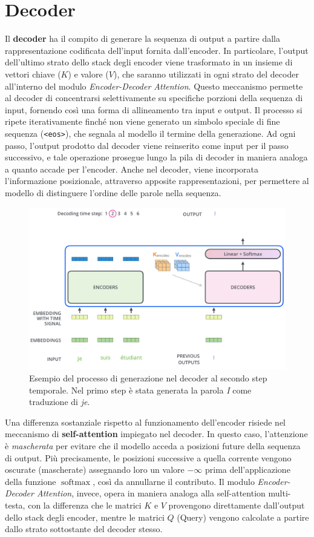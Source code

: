 \section{Decoder}

Il \textbf{decoder} ha il compito di generare la sequenza di output a partire dalla rappresentazione codificata dell’input fornita dall’encoder. In particolare, l’output dell’ultimo strato dello stack degli encoder viene trasformato in un insieme di vettori chiave ($K$) e valore ($V$), che saranno utilizzati in ogni strato del decoder all’interno del modulo \textit{Encoder-Decoder Attention}. Questo meccanismo permette al decoder di concentrarsi selettivamente su specifiche porzioni della sequenza di input, fornendo così una forma di allineamento tra input e output. Il processo si ripete iterativamente finché non viene generato un simbolo speciale di fine sequenza (\texttt{<eos>}), che segnala al modello il termine della generazione. Ad ogni passo, l’output prodotto dal decoder viene reinserito come input per il passo successivo, e tale operazione prosegue lungo la pila di decoder in maniera analoga a quanto accade per l’encoder. Anche nel decoder, viene incorporata l’informazione posizionale, attraverso apposite rappresentazioni, per permettere al modello di distinguere l’ordine delle parole nella sequenza.
\begin{figure}
    \centering
    \includegraphics[width=\textwidth]{figure/DecoderSample.png}
    \caption{Esempio del processo di generazione nel decoder al secondo step temporale. Nel primo step è stata generata la parola \textit{I} come traduzione di \textit{je}.}
    \label{fig:DecSam}
\end{figure}
Una differenza sostanziale rispetto al funzionamento dell’encoder risiede nel meccanismo di \textbf{self-attention} impiegato nel decoder. In questo caso, l’attenzione è \textit{mascherata} per evitare che il modello acceda a posizioni future della sequenza di output. Più precisamente, le posizioni successive a quella corrente vengono oscurate (mascherate) assegnando loro un valore $-\infty$ prima dell'applicazione della funzione $\operatorname{softmax}$, così da annullarne il contributo. Il modulo \textit{Encoder-Decoder Attention}, invece, opera in maniera analoga alla self-attention multi-testa, con la differenza che le matrici $K$ e $V$ provengono direttamente dall’output dello stack degli encoder, mentre le matrici $Q$ (Query) vengono calcolate a partire dallo strato sottostante del decoder stesso.

